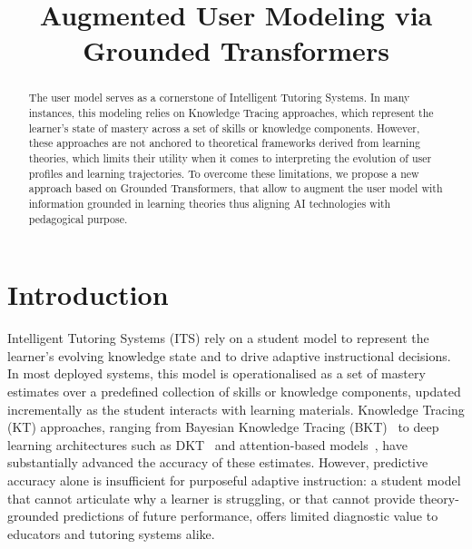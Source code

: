 \documentclass[runningheads]{llncs}
\begin{document}
%
\title{Augmented User Modeling via Grounded Transformers}
%
%
\authorrunning{}
%
\institute{}
%
\maketitle
%
\begin{abstract}

The user model serves as a cornerstone of Intelligent Tutoring Systems. In many instances, this modeling relies on Knowledge Tracing approaches, which represent the learner's state of mastery across a set of skills or knowledge components. However, these approaches are not anchored to theoretical frameworks derived from learning theories, which limits their utility when it comes to interpreting the evolution of user profiles and learning trajectories. To overcome these limitations, we propose a new approach based on Grounded Transformers, that allow to augment the user model with information grounded in learning theories thus aligning AI technologies with pedagogical purpose. 

\end{abstract}
%
%
\section{Introduction}

Intelligent Tutoring Systems (ITS) rely on a student model to represent the learner's evolving knowledge state and to drive adaptive instructional decisions. In most deployed systems, this model is operationalised as a set of mastery estimates over a predefined collection of skills or knowledge components, updated incrementally as the student interacts with learning materials. Knowledge Tracing (KT) approaches, ranging from Bayesian Knowledge Tracing (BKT)~\cite{corbett1994knowledge} to deep learning architectures such as DKT~\cite{piech2015deep} and attention-based models~\cite{ghosh2020context}, have substantially advanced the accuracy of these estimates. However, predictive accuracy alone is insufficient for purposeful adaptive instruction: a student model that cannot articulate why a learner is struggling, or that cannot provide theory-grounded predictions of future performance, offers limited diagnostic value to educators and tutoring systems alike.
\end{document}
